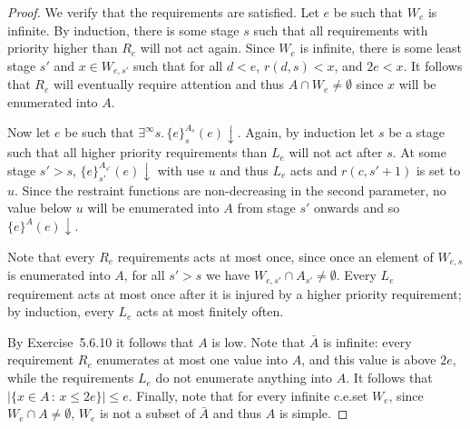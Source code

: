\documentclass{article}
\newcommand{\set}[1]{\{ #1 \}}
\newcommand{\compr}[2]{\{ #1 \,:\, #2 \}}
\newcommand{\terminates}{\!\!\downarrow}
\begin{document}
\begin{proof}
    We verify that the requirements are satisfied.  Let $e$ be such that $W_e$ is infinite.  By induction, there is some
    stage $s$ such that all requirements with priority higher than $R_e$ will not act again.  Since $W_e$ is infinite,
    there is some least stage $s'$ and $x \in W_{e,s'}$ such that for all $d < e$, $r(d, s) < x$, and $2e < x$.  It
    follows that $R_e$ will eventually require attention and thus $A \cap W_e \neq \emptyset$ since $x$ will be
    enumerated into $A$.

    Now let $e$ be such that $\exists^\infty s.\, \set{e}^{A_s}_s(e)\terminates$.  Again, by induction let $s$ be a
    stage such that all higher priority requirements than $L_e$ will not act after $s$.  At some stage $s' > s$,
    $\set{e}^{A_{s'}}_{s'}(e)\terminates$ with use $u$ and thus $L_e$ acts and $r(c, s'+1)$ is set to $u$.  Since the
    restraint functions are non-decreasing in the second parameter, no value below $u$ will be enumerated into $A$ from
    stage $s'$ onwards and so $\set{e}^{A}(e)\terminates$.

    Note that every $R_e$ requirements acts at most once, since once an element of $W_{e,s}$ is enumerated into $A$, for
    all $s' > s$ we have $W_{e,s'} \cap A_{s'} \neq \emptyset$.  Every $L_e$ requirement acts at most once after it is
    injured by a higher priority requirement; by induction, every $L_e$ acts at most finitely often.

    By Exercise~5.6.10 it follows that $A$ is low.  Note that $\bar{A}$ is infinite: every requirement $R_e$ enumerates
    at most one value into $A$, and this value is above $2e$, while the requirements $L_e$ do not enumerate anything
    into $A$.  It follows that $|\compr{x \in A}{x \le 2e}| \le e$.  Finally, note that for every infinite c.e.\@ set
    $W_e$, since $W_e \cap A \neq \emptyset$, $W_e$ is not a subset of $\bar{A}$ and thus $A$ is simple.
  \end{proof}
\end{document}
